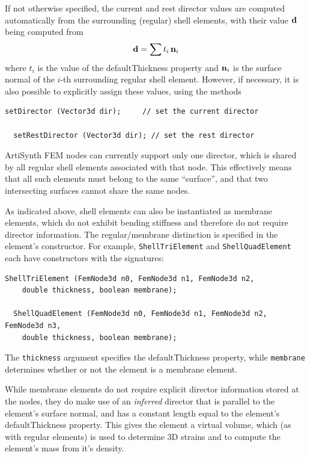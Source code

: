If not otherwise specified, the current and rest director values are
computed automatically from the surrounding (regular) shell elements,
with their value ${\bf d}$ being computed from
%
\begin{equation*}
{\bf d} = \sum t_i \, {\bf n}_i
\end{equation*}
%
where $t_i$ is the value of the {\sf defaultThickness} property and
${\bf n}_i$ is the surface normal of the $i$-th surrounding regular shell
element.
However, if necessary, it is also possible to explicitly assign
these values, using the methods
%
\begin{lstlisting}[]
  setDirector (Vector3d dir);     // set the current director

  setRestDirector (Vector3d dir); // set the rest director
\end{lstlisting}
%

\begin{sideblock}
ArtiSynth FEM nodes can currently support only one director, which
is shared by all regular shell elements associated with that
node. This effectively means that all such elements must belong to the
same ``surface'', and that two intersecting surfaces cannot share the
same nodes.
\end{sideblock}

As indicated above, shell elements can also be instantiated as
membrane elements, which do not exhibit bending stiffness and
therefore do not require director information. The regular/membrane
distinction is specified in the element's constructor.  For example,
{\tt ShellTriElement} and {\tt ShellQuadElement} each have
constructors with the signatures:
%
\begin{lstlisting}[]
  ShellTriElement (FemNode3d n0, FemNode3d n1, FemNode3d n2,
    double thickness, boolean membrane);

  ShellQuadElement (FemNode3d n0, FemNode3d n1, FemNode3d n2, FemNode3d n3,
    double thickness, boolean membrane);
\end{lstlisting}
%
The {\tt thickness} argument specifies the {\sf defaultThickness}
property, while {\tt membrane} determines whether or not the
element is a membrane element.

While membrane elements do not require explicit director information
stored at the nodes, they do make use of an {\it inferred} director
that is parallel to the element's surface normal, and has a constant
length equal to the element's {\sf defaultThickness} property. This
gives the element a virtual volume, which (as with regular elements)
is used to determine 3D strains and to compute the element's mass from
it's density.

